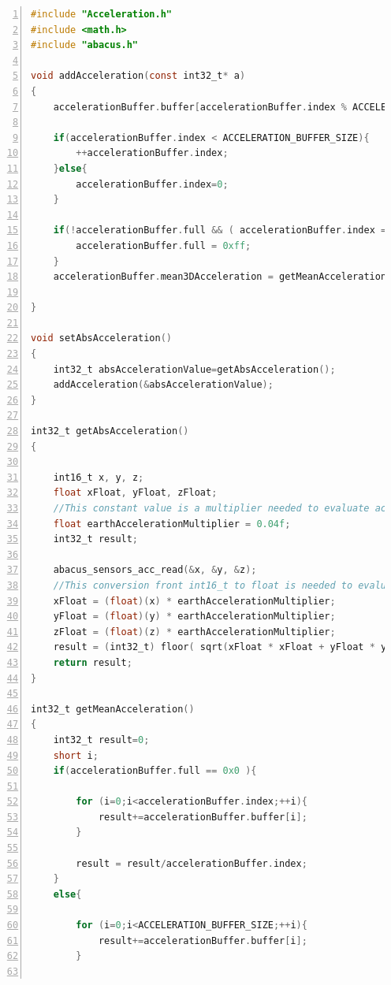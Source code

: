 \documentclass[LaM,binding=0.6cm,oneside]{../sapthesis}
\begin{document}
\begin{lstlisting}[language=C,
                   basicstyle=\scriptsize,
                   numbers=left,
                   stepnumber=0,
                   numbersep=4pt,
                   tabsize=2,
                   showspaces=false,
                   showstringspaces=false]
#include "Acceleration.h"
#include <math.h>
#include "abacus.h"

void addAcceleration(const int32_t* a)
{
    accelerationBuffer.buffer[accelerationBuffer.index % ACCELERATION_BUFFER_SIZE] = *a;

    if(accelerationBuffer.index < ACCELERATION_BUFFER_SIZE){
        ++accelerationBuffer.index;
    }else{
        accelerationBuffer.index=0;
    }

    if(!accelerationBuffer.full && ( accelerationBuffer.index == ACCELERATION_BUFFER_SIZE ) ){
        accelerationBuffer.full = 0xff;
    }
    accelerationBuffer.mean3DAcceleration = getMeanAcceleration();

}

void setAbsAcceleration()
{
    int32_t absAccelerationValue=getAbsAcceleration();
    addAcceleration(&absAccelerationValue);
}

int32_t getAbsAcceleration()
{

    int16_t x, y, z;
    float xFloat, yFloat, zFloat;   
    //This constant value is a multiplier needed to evaluate acceleration on earth
    float earthAccelerationMultiplier = 0.04f;
    int32_t result;

    abacus_sensors_acc_read(&x, &y, &z);
    //This conversion front int16_t to float is needed to evaluate with more precision the absolute value of acceleration
    xFloat = (float)(x) * earthAccelerationMultiplier;
    yFloat = (float)(y) * earthAccelerationMultiplier;
    zFloat = (float)(z) * earthAccelerationMultiplier;
    result = (int32_t) floor( sqrt(xFloat * xFloat + yFloat * yFloat + zFloat * zFloat ) ) ;
    return result;
}

int32_t getMeanAcceleration()
{
    int32_t result=0;
    short i;
    if(accelerationBuffer.full == 0x0 ){

        for (i=0;i<accelerationBuffer.index;++i){
            result+=accelerationBuffer.buffer[i];
        }

        result = result/accelerationBuffer.index;
    }
    else{

        for (i=0;i<ACCELERATION_BUFFER_SIZE;++i){
            result+=accelerationBuffer.buffer[i];
        }


\end{lstlisting}
\end{document}
